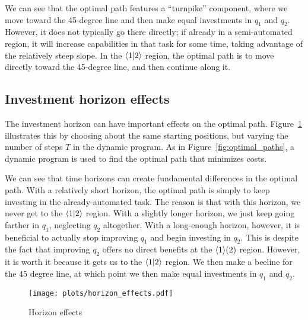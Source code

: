 \documentclass{article}
\theoremstyle{plain}
\theoremstyle{plain}
\begin{document}
We can see that the optimal path features a ``turnpike'' component, where we move toward the 45-degree line and then make equal investments in $q_1$ and $q_2$.
However, it does not typically go there directly; if already in a semi-automated region, it will increase capabilities in that task for some time, taking advantage of the relatively steep slope.
In the $\langle 1|2 \rangle$ region, the optimal path is to move directly toward the 45-degree line, and then continue along it.

\subsection{Investment horizon effects}
The investment horizon can have important effects on the optimal path.
Figure~\ref{fig:horizon_effects} illustrates this by choosing about the same starting positions, but varying the number of steps \(T\) in the dynamic program.
As in Figure~\ref{fig:optimal_paths}, a dynamic program is used to find the optimal path that minimizes costs.

We can see that time horizons can create fundamental differences in the optimal path.
With a relatively short horizon, the optimal path is simply to keep investing in the already-automated task.
The reason is that with this horizon, we never get to the \(\langle 1|2 \rangle\) region.
With a slightly longer horizon, we just keep going farther in \(q_1\), neglecting \(q_2\) altogether.
With a long-enough horizon, however, it is beneficial to actually stop improving \(q_1\) and begin investing in \(q_2\).
This is despite the fact that improving \(q_2\) offers no direct benefits at the $\langle 1 \rangle( 2 )$ region.
However, it is worth it because it gets us to the \(\langle 1|2 \rangle\) region.
We then make a beeline for the 45 degree line, at which point we then make equal investments in \(q_1\) and \(q_2\).

\begin{figure}
  \begin{center}
  \caption{Horizon effects} \label{fig:horizon_effects}
  \texttt{[image: plots/horizon\_effects.pdf]}
  \end{center}
\end{figure}
\end{document}
